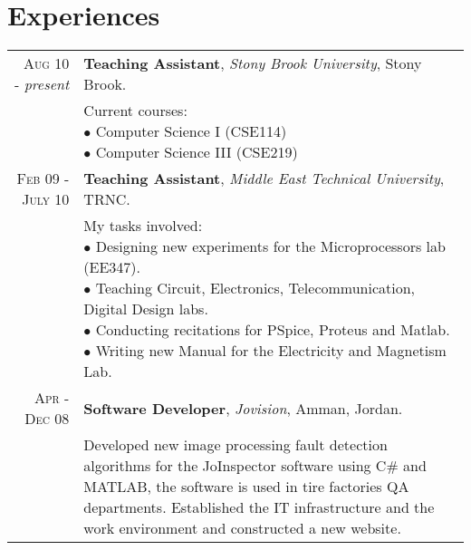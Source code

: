\documentclass[a4paper, oneside, final]{scrartcl}
\newcommand{\twidthb}{12.65cm}
\begin{document}
\section{Experiences}

\begin{tabular}{rm{\twidthb}}
\textsc{Aug 10} - \emph{present}  & \textbf{Teaching Assistant}, \emph{Stony Brook University}, Stony Brook. \\
                    & \footnotesize{\parbox{\twidthb}{
                        Current courses:\\
                        $\bullet$ Computer Science I (CSE114)\\
                        $\bullet$ Computer Science III (CSE219)}}

\\\textsc{Feb 09 - July 10}  & \textbf{Teaching Assistant}, \emph{Middle East Technical University}, TRNC. \\
                    & \footnotesize{\parbox{\twidthb}{
                        My tasks involved: \\
                        $\bullet$ Designing new experiments for the Microprocessors lab (EE347).\\
                        $\bullet$ Teaching Circuit, Electronics, Telecommunication, Digital Design labs.\\
                        $\bullet$ Conducting recitations for PSpice, Proteus and Matlab.\\
                        $\bullet$ Writing new Manual for the Electricity and Magnetism Lab.}}   

   \\ \textsc{Apr - Dec 08}  & \textbf{Software Developer}, \emph{Jovision}, Amman, Jordan. \\
                         & \footnotesize{Developed new image processing fault detection algorithms for the JoInspector software using C\# and MATLAB, the software is used in tire factories QA departments. Established the IT infrastructure and the work environment and constructed a new website.}

\\ 

\end{tabular}
\end{document}
